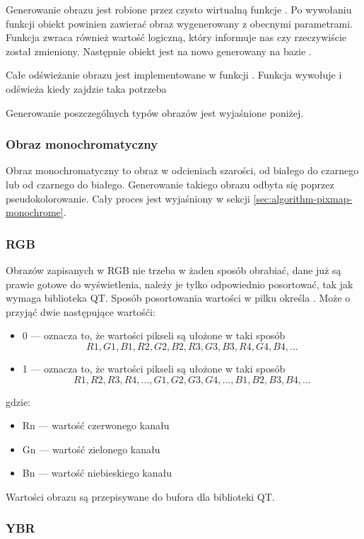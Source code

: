 Generowanie obrazu jest robione przez czysto wirtualną funkcje .
Po wywołaniu funkcji obiekt  powinien zawierać obraz wygenerowany z obecnymi parametrami.
Funkcja zwraca również wartość logiczną, który informuje nas czy  rzeczywiście został zmieniony.
Następnie obiekt  jest na nowo generowany na bazie .

Całe odświeżanie obrazu jest implementowane w funkcji .
Funkcja wywołuje  i odświeża  kiedy zajdzie taka potrzeba

Generowanie poszczególnych typów obrazów jest wyjaśnione poniżej.


\subsubsection{Obraz monochromatyczny}
\par
Obraz monochromatyczny to obraz w odcieniach szarości, od białego do czarnego lub od czarnego do białego.
Generowanie takiego obrazu odbyta się poprzez pseudokolorowanie.
Cały proces jest wyjaśniony w sekcji \ref{sec:algorithm-pixmap-monochrome}.

\subsubsection{RGB}
Obrazów zapisanych w RGB nie trzeba w żaden sposób obrabiać, dane już są prawie gotowe do wyświetlenia, należy je tylko odpowiednio posortować, tak jak wymaga biblioteka QT.
Sposób posortowania wartości w pilku określa . Może o przyjąć dwie następujące wartośći:

\begin{itemize}
    \item 0 --- oznacza to, że wartości pikseli są ułożone w taki sposób
        \[R1, G1, B1, R2, G2, B2, R3, G3, B3, R4, G4, B4,  ...\]
    \item 1 --- oznacza to, że wartości pikseli są ułożone w taki sposób
        \[R1, R2, R3, R4, ... , G1, G2, G3, G4, ..., B1, B2, B3, B4, ...\]
\end{itemize}
gdzie:
\begin{itemize}
    \item Rn --- wartość czerwonego kanału
    \item Gn --- wartość zielonego kanału
    \item Bn --- wartość niebieskiego kanału
\end{itemize}

Wartości obrazu są przepisywane do bufora dla biblioteki QT.


\subsubsection{YBR}

